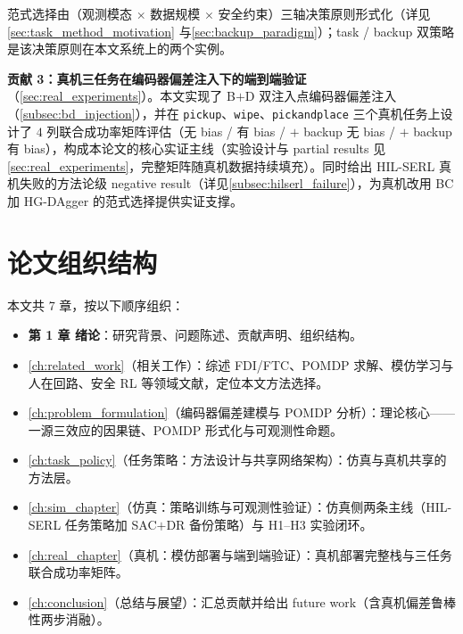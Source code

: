 \noindent 范式选择由（观测模态 $\times$ 数据规模 $\times$ 安全约束）三轴决策原则形式化（详见\cref{sec:task_method_motivation} 与\cref{sec:backup_paradigm}）；task / backup 双策略是该决策原则在本文系统上的两个实例。

\textbf{贡献 3：真机三任务在编码器偏差注入下的端到端验证}（\cref{sec:real_experiments}）。本文实现了 B$+$D 双注入点编码器偏差注入（\cref{subsec:bd_injection}），并在 \texttt{pickup}、\texttt{wipe}、\texttt{pickandplace} 三个真机任务上设计了 $4$ 列联合成功率矩阵评估（无 bias / 有 bias / $+$ backup 无 bias / $+$ backup 有 bias），构成本论文的核心实证主线（实验设计与 partial results 见\cref{sec:real_experiments}，完整矩阵随真机数据持续填充）。同时给出 HIL-SERL 真机失败的方法论级 negative result（详见\cref{subsec:hilserl_failure}），为真机改用 BC 加 HG-DAgger 的范式选择提供实证支撑。

\section{论文组织结构}\label{sec:organization}

本文共 7 章，按以下顺序组织：

\begin{itemize}
  \item \textbf{第 1 章 绪论}：研究背景、问题陈述、贡献声明、组织结构。
  \item \cref{ch:related_work}（相关工作）：综述 FDI/FTC、POMDP 求解、模仿学习与人在回路、安全 RL 等领域文献，定位本文方法选择。
  \item \cref{ch:problem_formulation}（编码器偏差建模与 POMDP 分析）：理论核心——一源三效应的因果链、POMDP 形式化与可观测性命题。
  \item \cref{ch:task_policy}（任务策略：方法设计与共享网络架构）：仿真与真机共享的方法层。
  \item \cref{ch:sim_chapter}（仿真：策略训练与可观测性验证）：仿真侧两条主线（HIL-SERL 任务策略加 SAC$+$DR 备份策略）与 H1–H3 实验闭环。
  \item \cref{ch:real_chapter}（真机：模仿部署与端到端验证）：真机部署完整栈与三任务联合成功率矩阵。
  \item \cref{ch:conclusion}（总结与展望）：汇总贡献并给出 future work（含真机偏差鲁棒性两步消融）。
\end{itemize}
